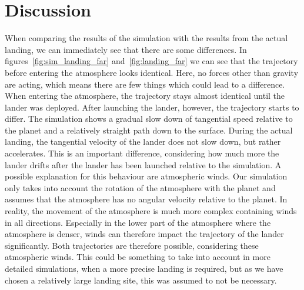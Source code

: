 \documentclass[reprint,english,notitlepage]{revtex4-2}
\begin{document}
\section{Discussion} \label{sec:discussion}
When comparing the results of the simulation with the results from the actual landing, we can immediately see that there are some differences.
In figures~\ref{fig:sim_landing_far} and~\ref{fig:landing_far} we can see that the trajectory before entering the atmosphere looks identical.
Here, no forces other than gravity are acting, which means there are few things which could lead to a difference.\\

When entering the atmosphere, the trajectory stays almost identical until the lander was deployed.
After launching the lander, however, the trajectory starts to differ.
The simulation shows a gradual slow down of tangential speed relative to the planet and a relatively straight path down to the surface.
During the actual landing, the tangential velocity of the lander does not slow down, but rather accelerates.
This is an important difference, considering how much more the lander drifts after the lander has been launched relative to the simulation.
A possible explanation for this behaviour are atmospheric winds.
Our simulation only takes into account the rotation of the atmosphere with the planet and assumes that the atmosphere has no angular velocity relative to the planet.
In reality, the movement of the atmosphere is much more complex containing winds in all directions.
Especially in the lower part of the atmosphere where the atmosphere is denser, winds can therefore impact the trajectory of the lander significantly.
Both trajectories are therefore possible, considering these atmospheric winds.
This could be something to take into account in more detailed simulations, when a more precise landing is required, but as we have chosen a relatively large landing site, this was assumed to not be necessary.
\end{document}
